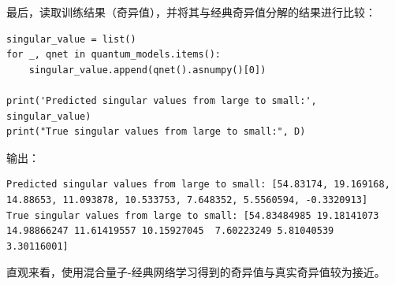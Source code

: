 最后，读取训练结果（奇异值），并将其与经典奇异值分解的结果进行比较：
\begin{lstlisting}
singular_value = list()
for _, qnet in quantum_models.items():
    singular_value.append(qnet().asnumpy()[0])

print('Predicted singular values from large to small:', singular_value)
print("True singular values from large to small:", D)
\end{lstlisting}
输出：
\begin{lstlisting}
Predicted singular values from large to small: [54.83174, 19.169168, 14.88653, 11.093878, 10.533753, 7.648352, 5.5560594, -0.3320913]
True singular values from large to small: [54.83484985 19.18141073 14.98866247 11.61419557 10.15927045  7.60223249 5.81040539  3.30116001]
\end{lstlisting}

直观来看，使用混合量子-经典网络学习得到的奇异值与真实奇异值较为接近。

